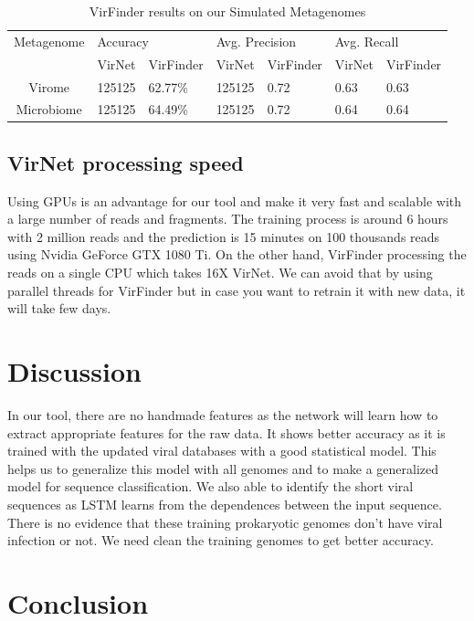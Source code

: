 \documentclass[conference]{IEEEtran}
\begin{document}
\begin{table}[h!]
	\centering
	\begin{tabular}{||c l l l l l l||} 
	Metagenome &	\multicolumn{2}{l}{Accuracy} & \multicolumn{2}{l}{Avg. Precision} & \multicolumn{2}{l}{Avg. Recall}\\ [0.5ex] 
	& VirNet & VirFinder & VirNet & VirFinder & VirNet & VirFinder \\
		\hline\hline
		Virome & 125125 &	62.77\%	& 125125 & 0.72 & 0.63 & 0.63 \\
		Microbiome &	125125 & 64.49\% &	125125 & 0.72 & 0.64 & 0.64 \\ [1ex]
	\end{tabular}
	\caption{VirFinder results on our Simulated Metagenomes}
	\label{table:virfinder_results_simulated}
\end{table}

\subsection{VirNet processing speed}
Using GPUs is an advantage for our tool and make it very fast and scalable with a large number of reads and fragments. The training process is around 6 hours with 2 million reads and the prediction is 15 minutes on 100 thousands reads using Nvidia GeForce GTX 1080 Ti. On the other hand, VirFinder processing the reads on a single CPU which takes 16X VirNet. We can avoid that by using parallel threads for VirFinder but in case you want to retrain it with new data, it will take few days. 

\section{Discussion}

In our tool, there are no handmade features as the network will learn how to extract appropriate features for the raw data. It shows better accuracy as it is trained with the updated viral databases with a good statistical model. This helps us to generalize this model with all genomes and to make a generalized model for sequence classification. We also able to identify the short viral sequences as LSTM learns from the dependences between the input sequence. 
There is no evidence that these training prokaryotic genomes don't have viral infection or not. We need clean the training genomes to get better accuracy.

\section{Conclusion}
\end{document}
